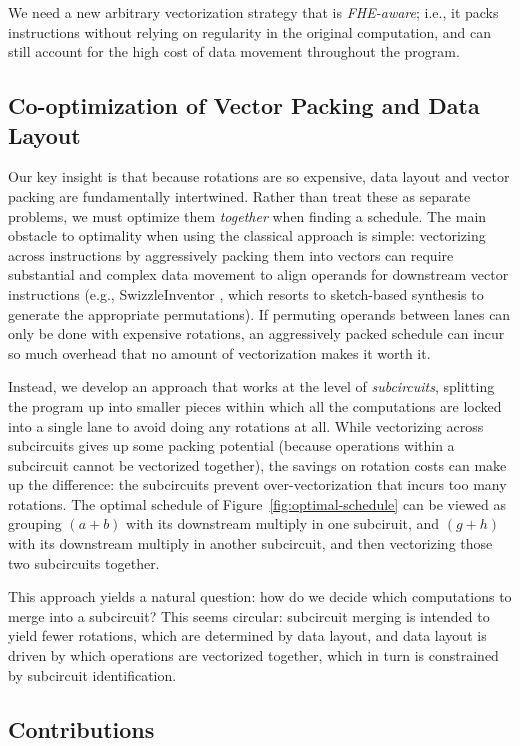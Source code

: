 We need a new arbitrary vectorization strategy that is {\em FHE-aware}; i.e., it packs instructions without relying on regularity in the original computation, and can still account for the high cost of data movement throughout the program.

\subsection{Co-optimization of Vector Packing and Data Layout}
Our key insight is that because rotations are so expensive, data layout and vector packing are fundamentally intertwined. Rather than treat these as separate problems, we must optimize them {\em together} when finding a schedule.
The main obstacle to optimality when using the classical approach is simple: vectorizing across instructions by aggressively packing them into vectors can require substantial and complex data movement to align operands for downstream vector instructions (e.g., SwizzleInventor \cite{SwizzleInventor}, which resorts to sketch-based synthesis to generate the appropriate permutations). If permuting operands between lanes can only be done with expensive rotations, an aggressively packed schedule can incur so much overhead that no amount of vectorization makes it worth it.

Instead, we develop an approach that works at the level of {\em subcircuits}, splitting the program up into smaller pieces within which all the computations are locked into a single lane to avoid doing any rotations at all. While vectorizing across subcircuits gives up some packing potential (because operations within a subcircuit cannot be vectorized together), the savings on rotation costs can make up the difference: the subcircuits prevent over-vectorization that incurs too many rotations. The optimal schedule of Figure~\ref{fig:optimal-schedule} can be viewed as grouping $(a + b)$ with its downstream multiply in one subciruit, and $(g + h)$ with its downstream multiply in another subcircuit, and then vectorizing those two subcircuits together.

This approach yields a natural question: how do we decide which computations to merge into a subcircuit? This seems circular: subcircuit merging is intended to yield fewer rotations, which are determined by data layout, and data layout is driven by which operations are vectorized together, which in turn is constrained by subcircuit identification. 


\subsection{Contributions}

